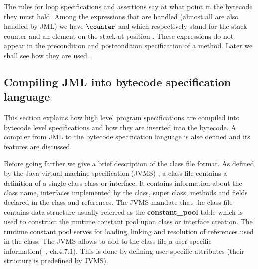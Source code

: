 The rules for loop specifications and assertions say at what point in the bytecode they must hold. Among the expressions that are handled (almost all are also handled
by JML) we have $\counter$ and \stack{\ArithExpr} which respectively stand for the stack counter and an element on the stack at position \ArithExpr. These expressions do not appear in the precondition and postcondition specification of a method. Later we shall see how they are used.
 
 
\subsection{Compiling JML into bytecode specification language}\label{comJML}

This section explains how high level program specifications are compiled into bytecode level specifications and how they are inserted into the bytecode. 
 A compiler from JML to the bytecode specification language is also defined and its features are discussed.


Before going farther we give a brief description of the class file format. As defined by the Java virtual machine  specification (JVMS) \cite{VMSpec}, a class file contains a definition of a single class class or interface. It contains information about the class name, interfaces implemented by the class, super class, methods and fields declared in the class and references. The JVMS mandate that the class file contains data structure usually referred as the \textbf{constant\_pool} table which is used to construct the runtime constant pool upon class or interface creation. The runtime constant pool serves for loading, linking and resolution of references used in the class. The JVMS allows to add to the class file a user specific information(~\cite{VMSpec}, ch.4.7.1). This is done by defining user specific attributes  (their structure is predefined by JVMS).

